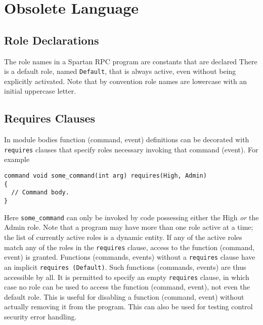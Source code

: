 
%
%

\section{Obsolete Language}

\subsection{Role Declarations}

The role names in a Spartan RPC program are constants that are declared 
There is a default role, named \texttt{Default}, that is always active, even without being
explicitly activated. Note that by convention role names are lowercase with an initial uppercase
letter.



\subsection{Requires Clauses}

In module bodies function (command, event) definitions can be decorated with \texttt{requires}
clauses that specify roles necessary invoking that command (event). For example
\begin{verbatim}
command void some_command(int arg) requires(High, Admin)
{
  // Command body.
}
\end{verbatim}

Here \texttt{some\_command} can only be invoked by code possessing either the High \emph{or} the
Admin role. Note that a program may have more than one role active at a time; the list of
currently active roles is a dynamic entity. If any of the active roles match any of the roles in
the \texttt{requires} clause, access to the function (command, event) is granted. Functions
(commands, events) without a \texttt{requires} clause have an implicit \texttt{requires
(Default)}. Such functions (commands, events) are thus accessible by all. It is permitted to
specify an empty \texttt{requires} clause, in which case no role can be used to access the
function (command, event), not even the default role. This is useful for disabling a function
(command, event) without actually removing it from the program. This can also be used for
testing control security error handling.

